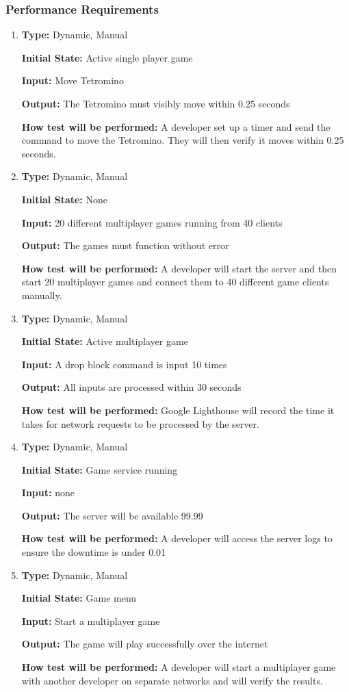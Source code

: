 \documentclass[12pt, titlepage]{article}
\begin{document}
	
	\subsubsection{Performance Requirements}
	\begin{enumerate}[{NFR-PR}1. ]
		\item
		\textbf{Type:} Dynamic, Manual
		
		\textbf{Initial State:} Active single player game
		
		\textbf{Input:} Move Tetromino 
		
		\textbf{Output:} The Tetromino must visibly move within 0.25 seconds
		
		\textbf{How test will be performed:} A developer set up a timer and send the command to move the Tetromino. They will then verify it moves within 0.25 seconds.
		
		\item
		\textbf{Type:} Dynamic, Manual
		
		\textbf{Initial State:} None
		
		\textbf{Input:} 20 different multiplayer games running from 40 clients 
		
		\textbf{Output:} The games must function without error
		
		\textbf{How test will be performed:} A developer will start the server and then start 20 multiplayer games and connect them to 40 different game clients manually.
		
		
		\item
		\textbf{Type:} Dynamic, Manual
		
		\textbf{Initial State:} Active multiplayer game
		
		\textbf{Input:} A drop block command is input 10 times
		
		\textbf{Output:} All inputs are processed within 30 seconds
		
		\textbf{How test will be performed:} Google Lighthouse will record the time it takes for network requests to be processed by the server.
		
		\item
		\textbf{Type:} Dynamic, Manual
		
		\textbf{Initial State:} Game service running
		
		\textbf{Input:} none 
		
		\textbf{Output:} The server will be available 99.99%
		
		\textbf{How test will be performed:} A developer will access the server logs to ensure the downtime is under 0.01%
		
		\item 
		\textbf{Type:} Dynamic, Manual
		
		\textbf{Initial State:} Game menu
		
		\textbf{Input:} Start a multiplayer game 
		
		\textbf{Output:} The game will play successfully over the internet
		
		\textbf{How test will be performed:} A developer will start a multiplayer game with another developer on separate networks and will verify the results.
		
	\end{enumerate}
	
\end{document}
